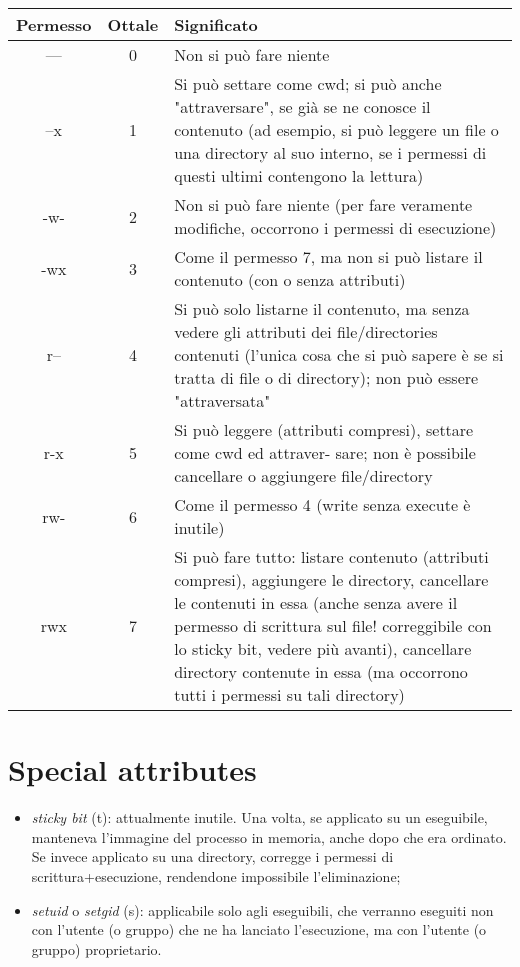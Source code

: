 \begin{center}
	\begin{tabular}{|c|c|p{10cm}|} 
		\hline
		Permesso & Ottale & Significato \\ \hline
		--- & 0 & Non si può fare niente \\ \hline
		--x & 1 & Si  può settare  come  cwd;  si  può anche  "attraversare",  se  già se
		ne conosce il contenuto (ad esempio, si può leggere un file o una
		directory al suo interno, se i permessi di questi ultimi contengono
		la lettura) \\ \hline
		-w- & 2 & Non si può fare niente (per fare veramente modifiche, occorrono i
		permessi di esecuzione) \\ \hline
		-wx & 3 & Come  il  permesso  7,  ma  non  si  può listare  il  contenuto  (con  o
		senza attributi) \\ \hline
		r-- & 4 & Si  può solo  listarne  il  contenuto,  ma  senza  vedere  gli  attributi
		dei file/directories contenuti (l'unica cosa che si può sapere è se si
		tratta di file o di directory); non può essere "attraversata"\\ \hline		
		r-x & 5 & Si può leggere (attributi compresi), settare come cwd ed attraver-
		sare; non è possibile cancellare o aggiungere file/directory \\ \hline
		rw- & 6 & Come il permesso 4 (write senza execute è inutile) \\ \hline
		rwx & 7 & Si può fare tutto: listare contenuto (attributi compresi), aggiungere le directory, cancellare le contenuti in essa (anche senza avere il permesso di scrittura sul file! correggibile con lo sticky bit, vedere più avanti), cancellare directory contenute in essa (ma occorrono tutti i permessi su tali directory) \\ \hline
	\end{tabular}
\end{center}

\section{Special attributes}
\begin{itemize}
    \item \textit{sticky bit} (t): attualmente inutile. Una volta, se applicato su un eseguibile, manteneva l'immagine del processo in memoria, anche dopo che era ordinato. Se invece applicato su una directory, corregge i permessi di scrittura+esecuzione, rendendone impossibile l'eliminazione;
    \item \textit{setuid} o \textit{setgid} (s): applicabile solo agli eseguibili, che verranno eseguiti non con l'utente (o gruppo) che ne ha lanciato l'esecuzione, ma con l'utente (o gruppo) proprietario.
\end{itemize}

